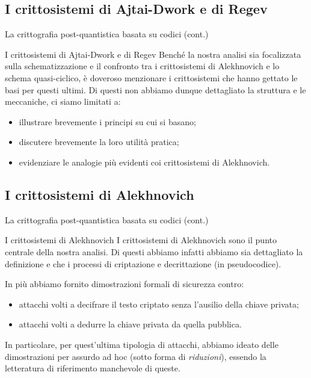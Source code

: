 \documentclass[10pt]{beamer}
\begin{document}
		\subsection{I crittosistemi di Ajtai-Dwork e di Regev}
			\begin{frame}{La crittografia post-quantistica basata su codici (cont.)}
				\begin{block}{I crittosistemi di Ajtai-Dwork e di Regev}
					Benché la nostra analisi sia focalizzata sulla schematizzazione e il confronto tra i crittosistemi di Alekhnovich e lo schema quasi-ciclico, è doveroso menzionare i crittosistemi che hanno gettato le basi per questi ultimi. Di questi non abbiamo dunque dettagliato la struttura e le meccaniche, ci siamo limitati a:
					\begin{itemize}
						\item illustrare brevemente i principi su cui si basano;
						\item discutere brevemente la loro utilità pratica;
						\item evidenziare le analogie più evidenti coi crittosistemi di Alekhnovich.
					\end{itemize} 
				\end{block}
			\end{frame}
		\subsection{I crittosistemi di Alekhnovich}
			\begin{frame}{La crittografia post-quantistica basata su codici (cont.)}
				\begin{block}{I crittosistemi di Alekhnovich}
					I crittosistemi di Alekhnovich sono il punto centrale della nostra analisi. Di questi abbiamo infatti abbiamo sia dettagliato la definizione e che i processi di criptazione e decrittazione (in pseudocodice).
					
					In più abbiamo fornito dimostrazioni formali di sicurezza contro:
					\begin{itemize}
						\item attacchi volti a decifrare il testo criptato senza l'ausilio della chiave privata;
						\item attacchi volti a dedurre la chiave privata da quella pubblica.
					\end{itemize}
					In particolare, per quest'ultima tipologia di attacchi, abbiamo ideato delle dimostrazioni per assurdo ad hoc (sotto forma di \emph{riduzioni}), essendo la letteratura di riferimento manchevole di queste.
				\end{block}
			\end{frame}
\end{document}
